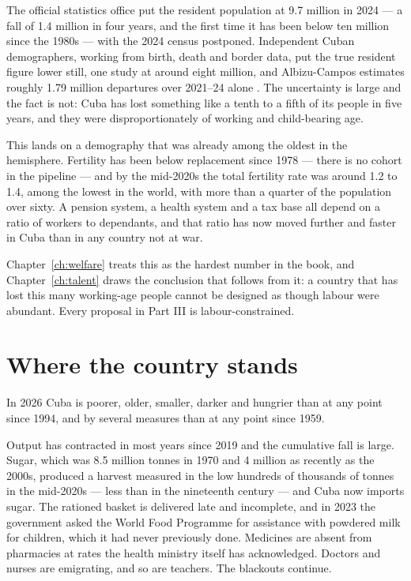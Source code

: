 The official statistics office put the resident population at 9.7 million in
2024 --- a fall of 1.4 million in four years, and the first time it has been
below ten million since the 1980s --- with the 2024 census postponed.
Independent Cuban demographers, working from birth, death and border data, put
the true resident figure lower still, one study at around eight million, and
Albizu-Campos estimates roughly 1.79 million departures over 2021--24
alone \citep{onei}.\unv{} The uncertainty is large and the fact is not: Cuba has lost
something like a tenth to a fifth of its people in five years, and they were
disproportionately of working and child-bearing age.

This lands on a demography that was already among the oldest in the hemisphere.
Fertility has been below replacement since 1978 --- there is no cohort in the
pipeline --- and by the mid-2020s the total fertility rate was around 1.2 to
1.4, among the lowest in the world, with more than a quarter of the population
over sixty.\unv{} A pension system, a health system and a tax base all depend on
a ratio of workers to dependants, and that ratio has now moved further and
faster in Cuba than in any country not at war.

Chapter~\ref{ch:welfare} treats this as the hardest number in the book, and
Chapter~\ref{ch:talent} draws the conclusion that follows from it: a country
that has lost this many working-age people cannot be designed as though labour
were abundant. Every proposal in Part III is labour-constrained.

\section{Where the country stands}

In 2026 Cuba is poorer, older, smaller, darker and hungrier than at any point
since 1994, and by several measures than at any point since 1959.

Output has contracted in most years since 2019 and the cumulative fall is
large.\unv{} Sugar, which was 8.5 million tonnes in 1970 and 4 million as
recently as the 2000s, produced a harvest measured in the low hundreds of
thousands of tonnes in the mid-2020s --- less than in the nineteenth century ---
and Cuba now imports sugar.\unv{} The rationed basket is delivered late and
incomplete, and in 2023 the government asked the World Food Programme for
assistance with powdered milk for children, which it had never previously
done.\unv{} Medicines are absent from pharmacies at rates the health ministry
itself has acknowledged. Doctors and nurses are emigrating, and so are teachers.
The blackouts continue.

